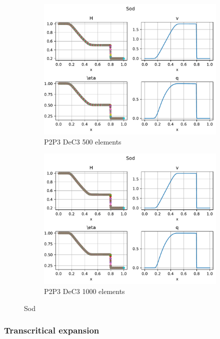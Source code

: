\documentclass[english]{article}
\theoremstyle{thmstyleone}
\theoremstyle{thmstyletwo}
\theoremstyle{thmstylethree}
\begin{document}
\begin{figure}
{\begin{minipage}{\textwidth}
\begin{subfigure}{0.45\textwidth}
				\includegraphics[trim= 0 180 0 0, clip,width=\textwidth]{figures/sod/P2P3_DeC_N_el00500.pdf}
				\caption{P2P3 DeC3 500 elements}
			\end{subfigure}
			\begin{subfigure}{0.45\textwidth}
				\includegraphics[trim= 0 180 0 0, clip,width=\textwidth]{figures/sod/P2P3_DeC_N_el01000.pdf}
				\caption{P2P3 DeC3 1000 elements}
			\end{subfigure}
		\end{minipage}%
	}
	\caption{Sod}\label{fig:sod}
\end{figure}


\subsubsection{Transcritical expansion}
\end{document}
